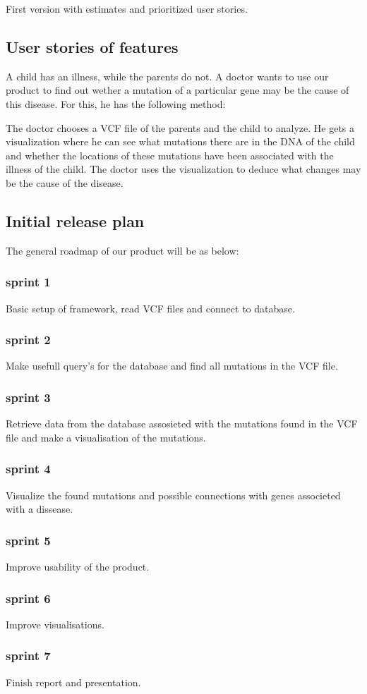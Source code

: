 First version with estimates and prioritized user stories.
		\subsection{User stories of features}
A child has an illness, while the parents do not. 
A doctor wants to use our product to find out wether a mutation of a particular gene may be the cause of this disease. 
For this, he has the following method: 

The doctor chooses a VCF file of the parents and the child to analyze. 
He gets a visualization where he can see what mutations there are in the DNA of the child and whether the locations of these mutations have been associated with the illness of the child. 
The doctor uses the visualization to deduce what changes may be the cause of the disease.
		\subsection{Initial release plan}
The general roadmap of our product will be as below:

\subsubsection*{sprint 1}
Basic setup of framework, read VCF files and connect to database.

\subsubsection*{sprint 2}
Make usefull query's for the database and find all mutations in the VCF file.

\subsubsection*{sprint 3}
Retrieve data from the database assosieted with the mutations found in the VCF file and make a visualisation of the mutations.

\subsubsection*{sprint 4}
Visualize the found mutations and possible connections with genes associeted with a dissease.

\subsubsection*{sprint 5}
Improve usability of the product.

\subsubsection*{sprint 6}
Improve visualisations.

\subsubsection*{sprint 7}
Finish report and presentation.
